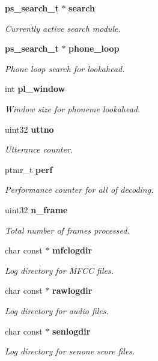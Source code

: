 \begin{DoxyCompactItemize}
{\bf ps\+\_\+search\+\_\+t} $\ast$ {\bf search}
\begin{DoxyCompactList}\small\item\em Currently active search module. \end{DoxyCompactList}\item 
{\bf ps\+\_\+search\+\_\+t} $\ast$ {\bf phone\+\_\+loop}
\begin{DoxyCompactList}\small\item\em Phone loop search for lookahead. \end{DoxyCompactList}\item 
int {\bf pl\+\_\+window}
\begin{DoxyCompactList}\small\item\em Window size for phoneme lookahead. \end{DoxyCompactList}\item 
uint32 {\bf uttno}
\begin{DoxyCompactList}\small\item\em Utterance counter. \end{DoxyCompactList}\item 
ptmr\+\_\+t {\bf perf}
\begin{DoxyCompactList}\small\item\em Performance counter for all of decoding. \end{DoxyCompactList}\item 
uint32 {\bf n\+\_\+frame}
\begin{DoxyCompactList}\small\item\em Total number of frames processed. \end{DoxyCompactList}\item 
char const $\ast$ {\bf mfclogdir}
\begin{DoxyCompactList}\small\item\em Log directory for M\+F\+C\+C files. \end{DoxyCompactList}\item 
char const $\ast$ {\bf rawlogdir}
\begin{DoxyCompactList}\small\item\em Log directory for audio files. \end{DoxyCompactList}\item 
char const $\ast$ {\bf senlogdir}
\begin{DoxyCompactList}\small\item\em Log directory for senone score files. \end{DoxyCompactList}\end{DoxyCompactItemize}


